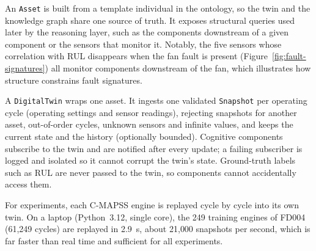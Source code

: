 An \texttt{Asset} is built from a template individual in the ontology, so the twin and the
knowledge graph share one source of truth. It exposes structural queries used later by the
reasoning layer, such as the components downstream of a given component or the sensors that
monitor it. Notably, the five sensors whose correlation with RUL disappears when the fan fault is
present (Figure~\ref{fig:fault-signatures}) all monitor components downstream of the fan, which
illustrates how structure constrains fault signatures.

A \texttt{DigitalTwin} wraps one asset. It ingests one validated \texttt{Snapshot} per operating
cycle (operating settings and sensor readings), rejecting snapshots for another asset, out-of-order
cycles, unknown sensors and infinite values, and keeps the current state and the history (optionally
bounded). Cognitive components subscribe to the twin and are notified after every update; a
failing subscriber is logged and isolated so it cannot corrupt the twin's state. Ground-truth labels
such as RUL are never passed to the twin, so components cannot accidentally access them.

For experiments, each C-MAPSS engine is replayed cycle by cycle into its own twin. On a laptop
(Python~3.12, single core), the 249 training engines of FD004 (61{,}249 cycles) are replayed in
\SI{2.9}{\second}, about 21{,}000 snapshots per second, which is far faster than real time and
sufficient for all experiments. 

